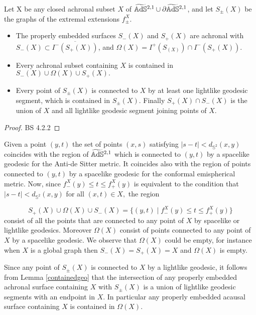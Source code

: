 \begin{lemma}\label{422}
    Let X be any closed achronal subset $X$ of $\widetilde{\mathbb{A}\mathrm{d}\mathbb{S}}{}^{2,1}\cup\partial\widetilde{\mathbb{A}\mathrm{d}\mathbb{S}}{}^{2,1}$, and let $S_\pm(X)$ be the graphs of the extremal extensions $f_\pm^X$. 
    \begin{itemize}
        \item The properly embedded surfaces $S_-(X)$ and $S_+(X)$ are achronal with $S_-(X)\subset \overline{I^-(S_+(X))}$, and $\Omega(X)=I^+(S_(X))\cap I^-(S_+(X)).$
        \item Every achronal subset containing $X$ is contained in $S_-(X)\cup\Omega(X)\cup S_+(X).$
        \item Every point of $S_\pm(X)$ is connected to $X$ by at least one lightlike geodesic segment, which is contained in $S_\pm(X).$ Finally $S_+(X)\cap S_-(X)$ is the union of $X$ and all lightlike geodesic segment joining points of $X$.
    \end{itemize}
\end{lemma}
\begin{proof}
    BS 4.2.2
\end{proof}

\begin{observation}\label{423}
    Given a point $(y,t)$ the set of points $(x,s)$ satisfying $\lvert s-t \rvert<d_{\mathbb{S}^2}(x,y)$ coincides with the region of $\widetilde{\mathbb{A}\mathrm{d}\mathbb{S}}{}^{2,1}$ which is connected to $(y,t)$ by a spacelike geodesic for the Anti-de Sitter metric. It coincides also with the region of points connected to $(y,t)$ by a spacelike geodesic for the conformal emispherical metric. Now, since $f_-^X(y)\leq t\leq f_+^X(y)$ is equivalent to the condition that $\lvert s-t \rvert<d_{\mathbb{S}^2}(x,y)$ for all $(x,t)\in X,$ the region 

    \[
        S_+(X)\cup\Omega(X)\cup S_-(X)=\{(y,t)\;|\; f_-^X(y)\leq t\leq f_+^X(y)\}
    \]
    consist of all the points that are connected to any point of $X$ by spacelike or lightlike geodesics. Moreover $\Omega(X)$ consist of points connected to any point of $X$ by a spacelike geodesic. We observe that $\Omega(X)$ could be empty, for instance when $X$ is a global graph then $S_-(X)=S_+(X)=X$ and $\Omega(X)$ is empty.
\end{observation}

\begin{observation}
    Since any point of $S_\pm(X)$ is connected to $X$ by a lightlike geodesic, it follows from Lemma \ref{containedgeo} that the intersection of any properly embedded achronal surface containing $X$ with $S_\pm(X)$ is a union of lightlike geodesic segments with an endpoint in $X$. In particular any properly embedded acausal surface containing $X$ is contained in $\Omega(X).$
\end{observation}

